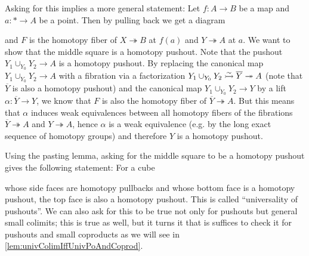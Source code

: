 Asking for this implies a more general statement:
Let $f\colon A\to B$ be a map and $a\colon *\to A$ be a point.
Then by pulling back we get a diagram 
\begin{center}
\end{center}
and $F$ is the homotopy fiber of $X\twoheadrightarrow B$ at $f(a)$ and $Y\twoheadrightarrow A$ at $a$.
We want to show that the middle square is a homotopy pushout.
Note that the pushout $Y_1\cup_{Y_0}Y_2\to A$ is a homotopy pushout. 
By replacing the canonical map $Y_1\cup_{Y_0}Y_2\to A$ with a fibration via a factorization $Y_1\cup_{Y_0}Y_2\xtailrightarrow{\sim}\overline{Y}\twoheadrightarrow A$ (note that $\overline{Y}$ is also a homotopy pushout) and the canonical map $Y_1\cup_{Y_0}Y_2\to Y$ by a lift $\alpha\colon\overline{Y}\to Y$, we know that $F$ is also the homotopy fiber of $\overline{Y}\twoheadrightarrow A$.
But this means that $\alpha$ induces weak equivalences between all homotopy fibers of the fibrations $\overline{Y}\twoheadrightarrow A$ and $Y\twoheadrightarrow A$, hence $\alpha$ is a weak equivalence (e.g. by the long exact sequence of homotopy groups) and therefore $Y$ is a homotopy pushout.

Using the pasting lemma, asking for the middle square to be a homotopy pushout gives the following statement: 
For a cube 
\begin{center}
\end{center}
whose side faces are homotopy pullbacks and whose bottom face is a homotopy pushout, the top face is also a homotopy pushout.
This is called  ``universality of pushouts''.
We can also ask for this to be true not only for pushouts but general small colimits; this is true as well, but it turns it that is suffices to check it for pushouts and small coproducts as we will see in \cref{lem:univColimIffUnivPoAndCoprod}.

